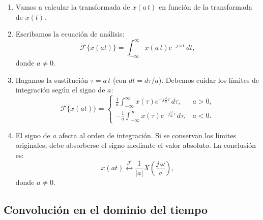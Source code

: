 \begin{enumerate}
	
	\item Vamos a calcular la transformada de $x(a \, t)$ en función de la transformada de $x(t)$.
	\item Escribamos la ecuación de análisis:
	\begin{equation}
		\mathcal{F}\{x(at)\} = \int_{-\infty}^{\infty} x(a \, t) e^{-j \, \omega \, t} \, dt,
	\end{equation}
	donde $a \neq 0$. 
	
	\item Hagamos la sustitución $\tau = a \, t$ (con $dt = d\tau / a$). Debemos cuidar los límites de integración según el signo de $a$:
	\begin{equation}
		\mathcal{F}\{x(at)\} = \begin{cases}
			\frac{1}{a} \int_{-\infty}^{\infty} x(\tau) e^{-j \frac{\omega}{a} \tau} \, d\tau , & a > 0, \\ 
			-\frac{1}{a} \int_{-\infty}^{\infty} x(\tau) e^{-j \frac{\omega}{a} \tau} \, d\tau , & a < 0.
		\end{cases}
	\end{equation}
	
	\item El signo de $a$ afecta al orden de integración. Si se conservan los límites originales, debe absorberse el signo mediante el valor absoluto. La conclusión es:
	\begin{equation}
		x(at) \stackrel{\mathcal{F}}{\longleftrightarrow} \frac{1}{|a|} X\left( \frac{j \, \omega}{a} \right) ,
	\end{equation}
	donde $a \neq 0$.
	
\end{enumerate}

\subsection{Convolución en el dominio del tiempo}

